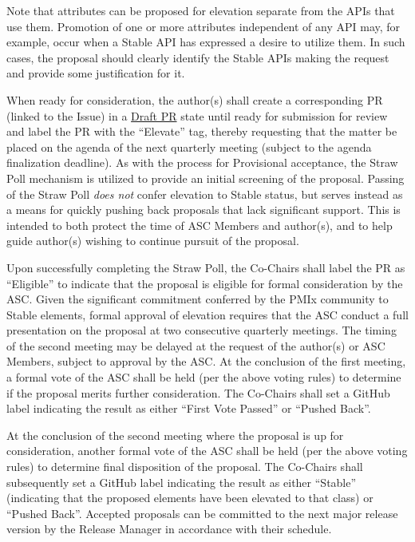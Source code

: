 \documentclass{article}
\begin{document}
Note that attributes can be proposed for elevation separate from the
APIs that use them. Promotion of one or more attributes independent of
any API may, for example, occur when a Stable API has expressed a
desire to utilize them. In such cases, the proposal should clearly
identify the Stable APIs making the request and provide some
justification for it.

When ready for consideration, the author(s) shall create a corresponding
PR (linked to the Issue) in a
\href{https://github.blog/2019-02-14-introducing-draft-pull-requests/}{Draft
PR} state until ready for submission for review and label the PR with
the ``Elevate'' tag, thereby requesting that the matter be placed on the
agenda of the next quarterly meeting (subject to the agenda finalization
deadline). As with the process for Provisional acceptance, the
Straw Poll mechanism is utilized to provide an initial
screening of the proposal. Passing of the Straw Poll \emph{does not}
confer elevation to Stable status, but serves instead as a means for
quickly pushing back proposals that lack significant support. This is
intended to both protect the time of ASC Members and author(s), and to
help guide author(s) wishing to continue pursuit of the proposal.

Upon successfully completing the Straw Poll, the Co-Chairs shall label
the PR as ``Eligible'' to indicate that the proposal is
eligible for formal consideration by the ASC. Given the significant
commitment conferred by the PMIx community to Stable elements,
formal approval of elevation requires that the ASC conduct a full
presentation on the proposal at two consecutive quarterly meetings. The
timing of the second meeting may be delayed at the request of the
author(s) or ASC Members, subject to approval by the ASC. At the
conclusion of the first meeting, a formal vote of the ASC shall be held
(per the above voting rules) to determine if the proposal merits further
consideration. The Co-Chairs shall set a GitHub label indicating the
result as either ``First Vote Passed'' or ``Pushed
Back''.

At the conclusion of the second meeting where the proposal is up for
consideration, another formal vote of the ASC shall be held (per the
above voting rules) to determine final disposition of the proposal. The
Co-Chairs shall subsequently set a GitHub label indicating the result as
either ``Stable'' (indicating that the proposed elements have
been elevated to that class) or ``Pushed Back''. Accepted
proposals can be committed to the next major release version by the
Release Manager in accordance with their schedule.
\end{document}
